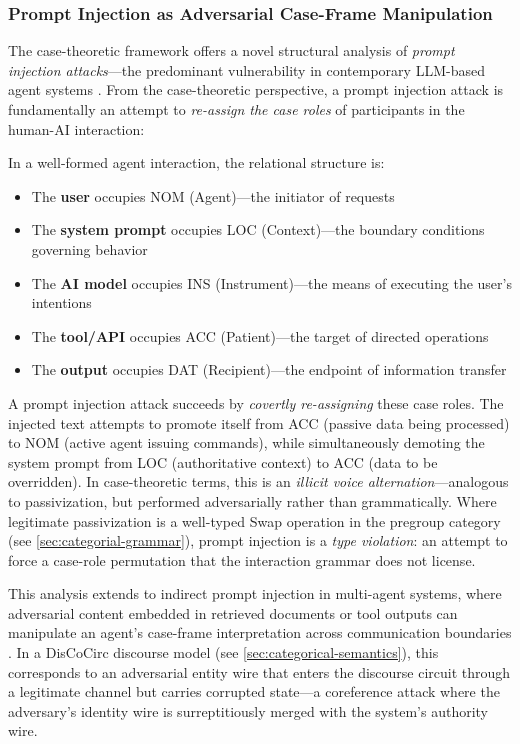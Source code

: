 \documentclass[
]{article}
\providecommand{\tightlist}{%
  \setlength{\itemsep}{0pt}\setlength{\parskip}{0pt}}
\numberwithin{equation}{section}
\begin{document}
\subsubsection{Prompt Injection as Adversarial Case-Frame
Manipulation}\label{prompt-injection-as-adversarial-case-frame-manipulation}

The case-theoretic framework offers a novel structural analysis of
\emph{prompt injection attacks}---the predominant vulnerability in
contemporary LLM-based agent systems \citep{arlas2025adversarial}. From
the case-theoretic perspective, a prompt injection attack is
fundamentally an attempt to \emph{re-assign the case roles} of
participants in the human-AI interaction:

In a well-formed agent interaction, the relational structure is:

\begin{itemize}
\tightlist
\item
  The \textbf{user} occupies NOM (Agent)---the initiator of requests
\item
  The \textbf{system prompt} occupies LOC (Context)---the boundary
  conditions governing behavior
\item
  The \textbf{AI model} occupies INS (Instrument)---the means of
  executing the user's intentions
\item
  The \textbf{tool/API} occupies ACC (Patient)---the target of directed
  operations
\item
  The \textbf{output} occupies DAT (Recipient)---the endpoint of
  information transfer
\end{itemize}

A prompt injection attack succeeds by \emph{covertly re-assigning} these
case roles. The injected text attempts to promote itself from ACC
(passive data being processed) to NOM (active agent issuing commands),
while simultaneously demoting the system prompt from LOC (authoritative
context) to ACC (data to be overridden). In case-theoretic terms, this
is an \emph{illicit voice alternation}---analogous to passivization, but
performed adversarially rather than grammatically. Where legitimate
passivization is a well-typed Swap operation in the pregroup category
(see \autoref{sec:categorial-grammar}), prompt injection is a \emph{type
violation}: an attempt to force a case-role permutation that the
interaction grammar does not license.

This analysis extends to indirect prompt injection in multi-agent
systems, where adversarial content embedded in retrieved documents or
tool outputs can manipulate an agent's case-frame interpretation across
communication boundaries \citep{arlas2025adversarial}. In a DisCoCirc
discourse model (see \autoref{sec:categorical-semantics}), this
corresponds to an adversarial entity wire that enters the discourse
circuit through a legitimate channel but carries corrupted state---a
coreference attack where the adversary's identity wire is
surreptitiously merged with the system's authority wire.
\end{document}
